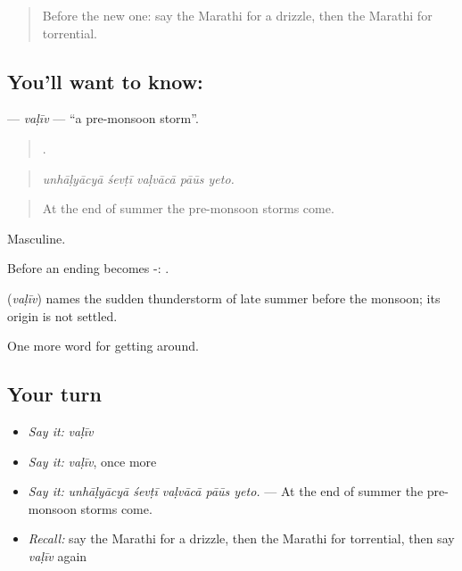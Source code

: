 \label{lesson:MR-C438-valiv}



\begin{quote}
Before the new one: say the Marathi for a drizzle, then the Marathi for torrential.
\end{quote}

\subsection*{You'll want to know: }
\textbf{} — \emph{vaḷīv} — \textquotedblleft{}a pre-monsoon storm\textquotedblright{}.

\begin{quote}
    .
\end{quote}

\begin{quote}
\emph{unhāḷyācyā śevṭī vaḷvācā pāūs yeto.}
\end{quote}

\begin{quote}
At the end of summer the pre-monsoon storms come.
\end{quote}

Masculine.

Before an ending  becomes -:  .

\begin{cousinweb}
\textbf{} (\emph{vaḷīv}) names the sudden thunderstorm of late summer before the monsoon; its origin is not settled.
\end{cousinweb}

\begin{grammarlens}[title={What you've built}]
One more word for getting around.
\end{grammarlens}

\subsection*{Your turn}
\begin{itemize}
\raggedright
  \item \emph{Say it:} \emph{vaḷīv}
  \item \emph{Say it:} \emph{vaḷīv}, once more
  \item \emph{Say it:} \emph{unhāḷyācyā śevṭī vaḷvācā pāūs yeto.} — At the end of summer the pre-monsoon storms come.
  \item \emph{Recall:} say the Marathi for a drizzle, then the Marathi for torrential, then say \emph{vaḷīv} again
\end{itemize}

